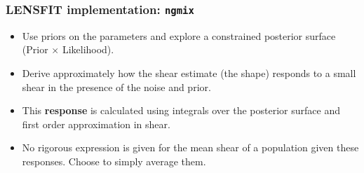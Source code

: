 \documentclass{beamer}
\newcommand{\ngmix}{\texttt{ngmix}}
\begin{document}
\frame
{
    \frametitle{LENSFIT implementation: \ngmix}

    \begin{itemize}

        \item Use priors on the parameters and explore a constrained posterior
            surface (Prior $\times$ Likelihood).

        \item Derive approximately how the shear estimate (the shape) responds
            to a small shear in the presence of the noise and prior.
            
        \item This {\bf response} is calculated using integrals over the
            posterior surface and first order approximation in shear.


        \item No rigorous expression is given for the mean shear of a
            population given these responses.  Choose to simply average them.
        
    \end{itemize}
}
\end{document}
